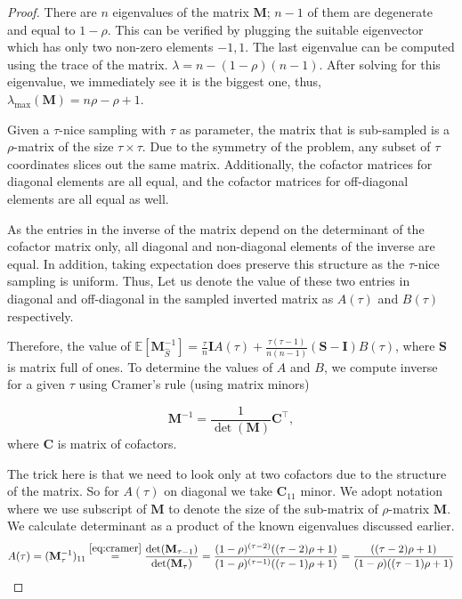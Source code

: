 \documentclass[10pt,a4paper]{amsart}
\newcommand{\bI}{\mathbf{I}}
\newcommand{\bM}{\mathbf{M}}
\begin{document}
	\begin{proof}
		There are $n$ eigenvalues of the matrix $\mathbf{M}$; $n-1$ of them are degenerate and equal to $1-\rho$. This can be verified by plugging the suitable eigenvector which has only two non-zero elements ${-1,1}$. The last eigenvalue can be computed using the trace of the matrix. $\lambda=n-(1-\rho)(n-1)$. After solving for this eigenvalue, we immediately see it is the biggest one, thus, $\lambda_{\max}(\mathbf{M})=n\rho-\rho+1$.
		
		Given a $\tau$-nice sampling with $\tau$ as parameter, the matrix that is sub-sampled is a $\rho$-matrix of the size $\tau \times \tau$. Due to the symmetry of the problem, any subset of $\tau$ coordinates slices out the same matrix. Additionally, the cofactor matrices for diagonal elements are all equal, and the cofactor matrices for off-diagonal elements are all equal as well.
		
		As the entries in the inverse of the matrix depend on the determinant of the cofactor matrix only, all diagonal and non-diagonal elements of the inverse are equal. In addition, taking expectation does preserve this structure as the $\tau$-nice sampling is uniform. Thus, Let us denote the value of these two entries in diagonal and off-diagonal in the sampled inverted matrix as $A(\tau)$ and $B(\tau)$ respectively.
		
		Therefore, the value of $\mathbb{E}[\mathbf{M}_{\hat{S}}^{-1}]=\frac{\tau}{n}\bI	A(\tau)+\frac{\tau(\tau-1)}{n(n-1)}(\mathbf{S}-\bI)B(\tau)$, where $\mathbf{S}$ is matrix full of ones. To determine the values of $A$ and $B$, we compute inverse for a given $\tau$ using Cramer's rule (using matrix minors)
		
		\begin{equation}\label{eq:cramer}
			\bM^{-1}=\frac{1}{\det(\bM)}\mathbf{C}^\top,
		\end{equation}
		where $\mathbf{C}$ is matrix of cofactors. 
		
		The trick here is that we need to look only at two cofactors due to the structure of the matrix. So for $A(\tau)$ on diagonal we take $\mathbf{C}_{11}$ minor. We adopt notation where we use subscript of $\mathbf{M}$ to denote the size of the sub-matrix of $\rho$-matrix $\mathbf{M}$. We calculate determinant as a product of the known eigenvalues discussed earlier. 
		\begin{equation*}
			A(\tau)=(\mathbf{M}_{\tau}^{-1})_{11}\stackrel{\eqref{eq:cramer}}=\frac{\det(\mathbf{M}_{\tau-1})}{\det(\mathbf{M}_{\tau})}=\frac{(1-\rho)^{(\tau-2)}((\tau-2)\rho+1)}{(1-\rho)^{(\tau-1)}((\tau-1)\rho+1)}=\frac{((\tau-2)\rho+1)}{(1-\rho)((\tau-1)\rho+1)} 
		\end{equation*}
		

\end{proof}
\end{document}
